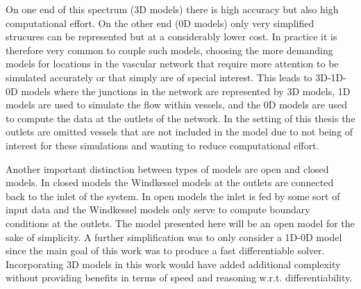 \documentclass[a4paper, oneside]{discothesis}
\begin{document}
On one end of this spectrum (3D models) there is high accuracy but also high computational effort.
On the other end (0D models) only very simplified strucures can be represented but at a considerably lower cost.
In practice it is therefore very common to couple such models, choosing the more demanding models for locations in the vascular network that require more attention to be simulated accurately or that simply are of special interest.
This leads to 3D-1D-0D models where the junctions in the network are represented by 3D models, 1D models are used to simulate the flow within vessels, and the 0D models are used to compute the data at the outlets of the network.
In the setting of this thesis the outlets are omitted vessels that are not included in the model due to not being of interest for these simulations and wanting to reduce computational effort.

Another important distinction between types of models are open and closed models.
In closed models the Windkessel models at the outlets are connected back to the inlet of the system.
In open models the inlet is fed by some sort of input data and the Windkessel models only serve to compute boundary conditions at the outlets.
The model presented here will be an open model for the sake of simplicity.
A further simplification was to only consider a 1D-0D model since the main goal of this work was to produce a fast differentiable solver.
Incorporating 3D models in this work would have added additional complexity without providing benefits in terms of speed and reasoning w.r.t. differentiability. \cite{köppl2023dimension}
\end{document}
